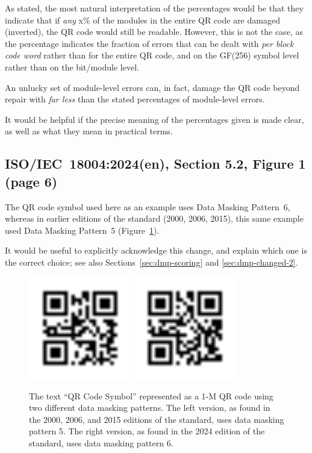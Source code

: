 \documentclass[a4paper,twoside]{article}
\newcommand{\shortstandard}{ISO/IEC~18004}
\newcommand{\standard}{\shortstandard:2024(en)}
\begin{document}
As stated, the most natural interpretation of the percentages would be that they indicate that if \emph{any} x\% of the
modules in the entire QR code are damaged (inverted), the QR code would still be readable. However, this is not the
case, as the percentage indicates the fraction of errors that can be dealt with \emph{per block code word} rather than for
the entire QR code, and on the GF(256) symbol level rather than on the bit/module level.

An unlucky set of module-level errors can, in fact, damage the QR code beyond repair with \emph{far less} than the stated
percentages of module-level errors.

It would be helpful if the precise meaning of the percentages given is made clear, as well as what they mean in practical
terms.

\subsection{\standard, Section 5.2, Figure 1 (page 6)}
\label{sec:dmp-changed-1}

The QR code symbol used here as an example uses Data Masking Pattern~6, whereas in earlier editions of the standard
(2000, 2006, 2015), this same example used Data Masking Pattern~5 (Figure~\ref{fig:dmp-changed-1}).

It would be useful to explicitly acknowledge this change, and explain which one is the correct choice;
see also Sections~\ref{sec:dmp-scoring} and \ref{sec:dmp-changed-2}.

\begin{figure}[h!]
\centering
\includegraphics[width=0.4\textwidth]{images/qrcode_iso18004_2000_2006_2015_QRCodeSymbol_1Mp5.png}
\includegraphics[width=0.4\textwidth]{images/qrcode_iso18004_2024_QRCodeSymbol_1Mp6.png}
\caption{The text ``QR Code Symbol'' represented as a 1-M QR code using two different data masking patterns.
         The left version, as found in the 2000, 2006, and 2015 editions of the standard, uses data masking pattern 5.
         The right version, as found in the 2024 edition of the standard, uses data masking pattern 6.}
\label{fig:dmp-changed-1}
\end{figure}
\end{document}
